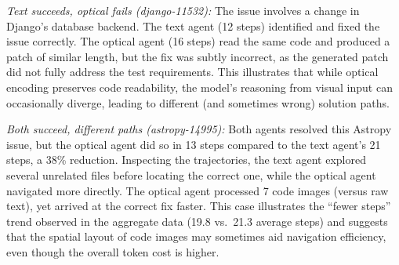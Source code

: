 \emph{Text succeeds, optical fails (django-11532):} The issue involves a change in Django's database backend. The text agent (12 steps) identified and fixed the issue correctly. The optical agent (16 steps) read the same code and produced a patch of similar length, but the fix was subtly incorrect, as the generated patch did not fully address the test requirements. This illustrates that while optical encoding preserves code readability, the model's reasoning from visual input can occasionally diverge, leading to different (and sometimes wrong) solution paths.

\emph{Both succeed, different paths (astropy-14995):} Both agents resolved this Astropy issue, but the optical agent did so in 13 steps compared to the text agent's 21 steps, a 38\% reduction. Inspecting the trajectories, the text agent explored several unrelated files before locating the correct one, while the optical agent navigated more directly. The optical agent processed 7 code images (versus raw text), yet arrived at the correct fix faster. This case illustrates the ``fewer steps'' trend observed in the aggregate data (19.8 vs.\ 21.3 average steps) and suggests that the spatial layout of code images may sometimes aid navigation efficiency, even though the overall token cost is higher.
